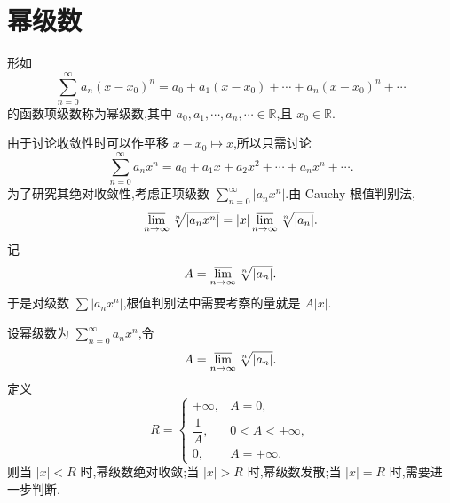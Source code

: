 \section{幂级数}

\begin{definition}
	形如
	\[
	\sum_{n = 0}^{\infty} a_n (x - x_0)^n
	= a_0 + a_1(x - x_0) + \cdots + a_n(x - x_0)^n + \cdots
	\]
	的函数项级数称为幂级数,其中 \(a_0,a_1,\cdots,a_n,\cdots \in \mathbb{R}\),且 \(x_0 \in \mathbb{R}\).
\end{definition}



由于讨论收敛性时可以作平移 \(x-x_0 \mapsto x\),所以只需讨论
\[
\sum_{n = 0}^{\infty} a_n x^n
= a_0 + a_1x + a_2x^2 + \cdots + a_nx^n + \cdots .
\]
为了研究其绝对收敛性,考虑正项级数 \(\sum\limits_{n=0}^{\infty}|a_nx^n|\).由 Cauchy 根值判别法,
\[
\varlimsup_{n\to\infty}\sqrt[n]{|a_nx^n|}
=
|x|\varlimsup_{n\to\infty}\sqrt[n]{|a_n|}.
\]
记
\[
A=\varlimsup_{n\to\infty}\sqrt[n]{|a_n|}.
\]
于是对级数 \(\sum |a_nx^n|\),根值判别法中需要考察的量就是 \(A|x|\).

\begin{proposition}
	设幂级数为 \(\sum\limits_{n=0}^{\infty}a_nx^n\),令
	\[
	A=\varlimsup_{n\to\infty}\sqrt[n]{|a_n|}.
	\]
	定义
	\[
	R=
	\begin{cases}
		+\infty, & A=0,\\[4pt]
		\dfrac{1}{A}, & 0<A<+\infty,\\[8pt]
		0, & A=+\infty.
	\end{cases}
	\]
	则当 \(|x|<R\) 时,幂级数绝对收敛;当 \(|x|>R\) 时,幂级数发散;当 \(|x|=R\) 时,需要进一步判断.
\end{proposition}

